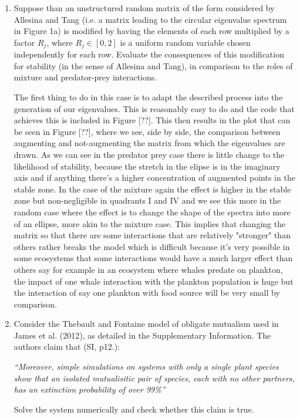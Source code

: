 \documentclass[11pt]{scrreprt}
\begin{document}
\begin{enumerate}
		\item Suppose than an unstructured random matrix of the form considered by Allesina and Tang (i.e. a matrix leading to the circular eigenvalue spectrum in Figure 1a) is modified by having the elements of each row multiplied by a factor $R_j$, where $R_j \in [0, 2]$ is a uniform random variable chosen independently for each row. Evaluate the consequences of this modification for stability (in the sense of Allesina and Tang), in comparison to the roles of mixture and predator-prey interactions.
		
		The first thing to do in this case is to adapt the described process into the generation of our eigenvalues. This is reasonably easy to do and the code that achieves this is included in Figure [??]. This then results in the plot that can be seen in Figure [??], where we see, side by side, the comparison between augmenting and not-augmenting the matrix from which the eigenvalues are drawn. As we can see in the predator prey case there is little change to the likelihood of stability, because the stretch in the elipse is in the imaginary axis and if anything there's a higher concentration of augmented points in the stable zone. In the case of the mixture again the effect is higher in the stable zone but non-negligible in quadrants I and IV and we see this more in the random case where the effect is to change the shape of the spectra into more of an ellipse, more akin to the mixture case. This implies that changing the matrix so that there are some interactions that are relatively "stronger" than others rather breaks the model which is difficult because it's very possible in some ecosystems that some interactions would have a much larger effect than others say for example in an ecosystem where whales predate on plankton, the impact of one whale interaction with the plankton population is huge but the interaction of say one plankton with food source will be very small by comparison.  
		
		\item Consider the Thebault and Fontaine model of obligate mutualism used in James et al. (2012), as detailed in the Supplementary Information. The authors claim that (SI, p12.): 
		
		\emph{``Moreover, simple simulations on systems with only a single plant species show that an isolated mutualisitic pair of species, each with no other partners, has an extinction probability of over 99\%'' }
		
		Solve the system numerically and check whether this claim is true.
		

\end{enumerate}
\end{document}
